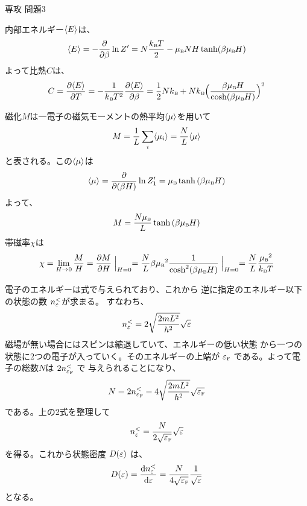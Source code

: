 \documentclass[fleqn]{jbook}
\begin{document}
\begin{answer}{専攻 問題3}{}
\begin{subanswers}
\begin{subsubanswers}
  \SubSubAnswer
    内部エネルギー$\langle{E}\rangle$は、
%
    \[ \Mean{E}  = -\Partial{}{\beta} \ln Z'%
	         =  N\frac{\kB T}{2}-\muB NH \tanh(\beta\muB H) \]
%
    よって比熱$C$は、
%
    \[ C  =  \Partial{\Mean{E}}{T}%
	  =  -\frac{1}{\kB T^2}\Partial{\Mean{E}}{\beta}%
	  =  \frac{1}{2}N \kB + N \kB \Bigl(\frac{\beta \muB H}{\cosh(\beta\muB H)}\Bigr)^2 \]


  \SubSubAnswer
    磁化$M$は一電子の磁気モーメントの熱平均$\langle{\mu}\rangle$を用いて
%
    \[ M = \frac{1}{L} \sum_i\langle{\mu_i}\rangle = \frac{N}{L}\langle{\mu}\rangle \]
%
    と表される。この$\langle{\mu}\rangle$は
%
    \[ \Mean{\mu} = \Partial{}{(\beta H)} \ln Z_1' %
	          = \muB \tanh{(\beta \muB  H)} \]
    よって、
%
    \[ M = \frac{N\muB}{L}\tanh{(\beta\muB  H)} \]
%
  \SubSubAnswer
    帯磁率$\chi$は
%
    \[ \chi = \lim_{H\to 0}\frac{M}{H}%
            = \Partial{M}{H}\Bigm|_{H=0}%
            = \frac{N}{L}\beta\muB ^2\frac{1}{\cosh^2(\beta\muB H)}\Bigm|_{H=0}%
            = \frac{N}{L}\frac{\muB ^2}{\kB T} \]

  \end{subsubanswers}


\SubAnswer

  \begin{subsubanswers}
  \SubSubAnswer
    電子のエネルギーは式で与えられており、これから
    逆に指定のエネルギー以下の状態の数 $n^{<}_{\varepsilon}$が求まる。
    すなわち、
%
    \[ n^{<}_{\varepsilon} = 2\sqrt{\frac{2mL^2}{h^2}} \sqrt{\varepsilon} \]
%
    磁場が無い場合にはスピンは縮退していて、エネルギーの低い状態
    から一つの状態に2つの電子が入っていく。そのエネルギーの上端が
    $\fermiE$ である。よって電子の総数$N$は $2n^{<}_{\fermiE}$ で
    与えられることになり、
%
    \[ N=2n^{<}_{\fermiE}=4\sqrt{\frac{2mL^2}{h^2}} \sqrt{\fermiE} \]
%
    である。上の2式を整理して
%
    \[ n^{<}_{\eps} = \frac{N}{2\sqrt{\fermiE}} \sqrt{\eps} \]
%
    を得る。これから状態密度 $D(\varepsilon)$ は、
%
    \[ D(\eps) = \Deriver{n^{<}_{\eps}}{\eps}%
          = \frac{N}{4\sqrt{\fermiE}} \frac{1}{\sqrt{\eps}} \]
%
    となる。


\end{subsubanswers}
\end{subanswers}
\end{answer}
\end{document}
